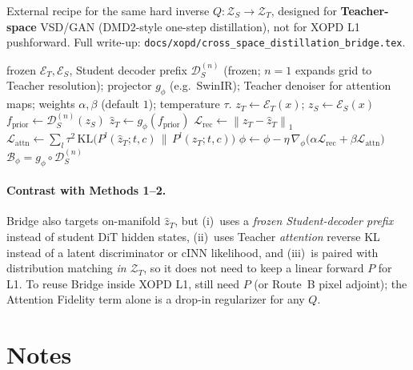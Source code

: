 \documentclass[11pt,a4paper]{article}
\newcommand{\Za}{\mathcal{Z}_{T}}
\newcommand{\Zb}{\mathcal{Z}_{S}}
\newcommand{\Enc}{\mathcal{E}}
\newcommand{\Dec}{\mathcal{D}}
\newcommand{\norm}[1]{\left\lVert #1 \right\rVert}
\newcommand{\zT}{z_{T}}
\newcommand{\zS}{z_{S}}
\newcommand{\Bridge}{\mathcal{B}}
\begin{document}
External recipe for the same hard inverse $Q:\Zb\!\to\!\Za$, designed for
\textbf{Teacher-space} VSD/GAN (DMD2-style one-step distillation), not for XOPD L1
pushforward. Full write-up:
\texttt{docs/xopd/cross\_space\_distillation\_bridge.tex}.

\begin{algorithm}[h]
\caption{Cross-Space Bridge --- offline training (summary)}
\label{alg:bridge}
\begin{algorithmic}[1]
\Require frozen $\Enc_T,\Enc_S$, Student decoder prefix $\Dec_S^{(n)}$ (frozen; $n{=}1$ expands
         grid to Teacher resolution); projector $g_\phi$ (e.g.\ SwinIR); Teacher denoiser for
         attention maps; weights $\alpha,\beta$ (default $1$); temperature $\tau$.
  \State $\zT \gets \Enc_T(x)$; \quad $\zS \gets \Enc_S(x)$
  \State $f_{\mathrm{prior}} \gets \Dec_S^{(n)}(\zS)$
  \State $\hat\zT \gets g_\phi(f_{\mathrm{prior}})$
  \State $\mathcal{L}_{\mathrm{rec}} \gets \norm{\zT-\hat\zT}_1$
  \State $\mathcal{L}_{\mathrm{attn}} \gets \sum_l \tau^2\,\mathrm{KL}\big(
         P^l(\hat\zT;t,c)\,\|\,P^l(\zT;t,c)\big)$
  \State $\phi \gets \phi - \eta\,\nabla_\phi\big(
         \alpha\mathcal{L}_{\mathrm{rec}}+\beta\mathcal{L}_{\mathrm{attn}}\big)$
\EndFor
\State \Return $\Bridge_\phi = g_\phi\circ\Dec_S^{(n)}$
\end{algorithmic}
\end{algorithm}

\paragraph{Contrast with Methods 1--2.}
Bridge also targets on-manifold $\hat\zT$, but (i)~uses a \emph{frozen Student-decoder
prefix} instead of student DiT hidden states, (ii)~uses Teacher \emph{attention} reverse KL
instead of a latent discriminator or cINN likelihood, and (iii)~is paired with
distribution matching \emph{in $\Za$}, so it does not need to keep a linear forward $P$
for L1. To reuse Bridge inside XOPD L1, still need $P$ (or Route~B pixel adjoint); the
Attention Fidelity term alone is a drop-in regularizer for any $Q$.

\section{Notes}
\label{sec:notes}
\end{document}
